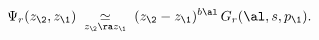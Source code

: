 \begin{equation}
\Psi_r(z_\2,z_\1)\;\underset{z_\2\ra z_\1}{\simeq}
\;(z_\2-z_\1)^{b\al}\,G_r(\al,s,p_\1).
\end{equation}

